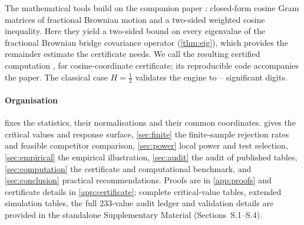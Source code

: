 The mathematical tools build on the companion paper \citep{AhmedCosChaos}: closed-form cosine Gram matrices of
fractional Brownian motion and a two-sided weighted cosine inequality. Here they yield a two-sided bound on every
eigenvalue of the fractional Brownian bridge covariance operator (\cref{thm:eig}), which provides the remainder estimate
the certificate needs. We call the resulting certified computation \CosCert{}, for cosine-coordinate certificate; its
reproducible code accompanies the paper. The classical case $H=\frac12$ \citep{AP97} validates the engine to
-- significant digits.

\paragraph{Organisation}  fixes the statistics, their normalisations and their common coordinates.
 gives the critical values and response surface, \cref{sec:finite} the finite-sample rejection rates and
feasible competitor comparison, \cref{sec:power} local power and test selection, \cref{sec:empirical} the empirical
illustration, \cref{sec:audit} the audit of published tables, \cref{sec:computation} the \CosCert{}
certificate and computational benchmark, and \cref{sec:conclusion} practical recommendations. Proofs are in
\cref{app:proofs} and certificate details in \cref{app:certificate}; complete critical-value tables, extended simulation
tables, the full 233-value audit ledger and validation details are provided in the standalone Supplementary Material
(Sections~S.1--S.4).
